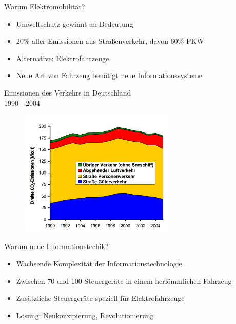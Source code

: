 \begin{frame}{Warum Elektromobilität?}
	\pause
	\begin{itemize}[<+->]
        \item Umweltschutz gewinnt an Bedeutung
        \item 20\% aller \COO Emissionen aus Straßenverkehr, davon 60\% PKW
        \item Alternative: Elektrofahrzeuge
        \item Neue Art von Fahrzeug benötigt neue Informationssysteme
    \end{itemize}
\end{frame}

\begin{frame}{\COO Emissionen des Verkehrs in Deutschland \\1990 - 2004}
    \vspace*{\fill}
    \begin{figure}[h!]
       \centering
        \includegraphics[width=0.66\textwidth,]{co2-emissionen.jpg}
    \end{figure}
    \vspace*{\fill}
\end{frame}



\begin{frame}{Warum neue Informationstechik?}
    \pause
    \begin{itemize}[<+->]
        \item Wachsende Komplexität der Informationstechnologie
        \item Zwischen 70 und 100 Steuergeräte in einem herlömmlichen Fahrzeug
        \item Zusätzliche Steuergeräte speziell für Elektrofahrzeuge
        \item Lösung: Neukonzipierung, Revolutionierung
    \end{itemize}
\end{frame}

